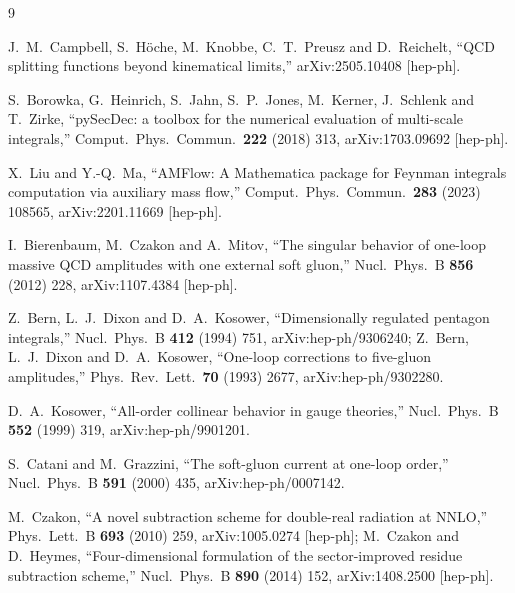 \documentclass[11pt,a4paper]{article}
\begin{document}
\begin{thebibliography}{9}

J.~M.~Campbell, S.~H\"oche, M.~Knobbe, C.~T.~Preusz and D.~Reichelt,
``QCD splitting functions beyond kinematical limits,''
arXiv:2505.10408 [hep-ph].

S.~Borowka, G.~Heinrich, S.~Jahn, S.~P.~Jones, M.~Kerner, J.~Schlenk and
T.~Zirke, ``pySecDec: a toolbox for the numerical evaluation of multi-scale
integrals,'' Comput.\ Phys.\ Commun.\ \textbf{222} (2018) 313,
arXiv:1703.09692 [hep-ph].

X.~Liu and Y.-Q.~Ma, ``AMFlow: A Mathematica package for Feynman integrals
computation via auxiliary mass flow,''
Comput.\ Phys.\ Commun.\ \textbf{283} (2023) 108565,
arXiv:2201.11669 [hep-ph].

I.~Bierenbaum, M.~Czakon and A.~Mitov, ``The singular behavior of one-loop
massive QCD amplitudes with one external soft gluon,''
Nucl.\ Phys.\ B \textbf{856} (2012) 228,
arXiv:1107.4384 [hep-ph].

Z.~Bern, L.~J.~Dixon and D.~A.~Kosower, ``Dimensionally regulated pentagon
integrals,'' Nucl.\ Phys.\ B \textbf{412} (1994) 751, arXiv:hep-ph/9306240;
Z.~Bern, L.~J.~Dixon and D.~A.~Kosower, ``One-loop corrections to five-gluon
amplitudes,'' Phys.\ Rev.\ Lett.\ \textbf{70} (1993) 2677,
arXiv:hep-ph/9302280.

D.~A.~Kosower, ``All-order collinear behavior in gauge theories,''
Nucl.\ Phys.\ B \textbf{552} (1999) 319, arXiv:hep-ph/9901201.

S.~Catani and M.~Grazzini, ``The soft-gluon current at one-loop order,''
Nucl.\ Phys.\ B \textbf{591} (2000) 435, arXiv:hep-ph/0007142.

M.~Czakon, ``A novel subtraction scheme for double-real radiation at NNLO,''
Phys.\ Lett.\ B \textbf{693} (2010) 259, arXiv:1005.0274 [hep-ph];
M.~Czakon and D.~Heymes, ``Four-dimensional formulation of the sector-improved
residue subtraction scheme,'' Nucl.\ Phys.\ B \textbf{890} (2014) 152,
arXiv:1408.2500 [hep-ph].

\end{thebibliography}
\end{document}
